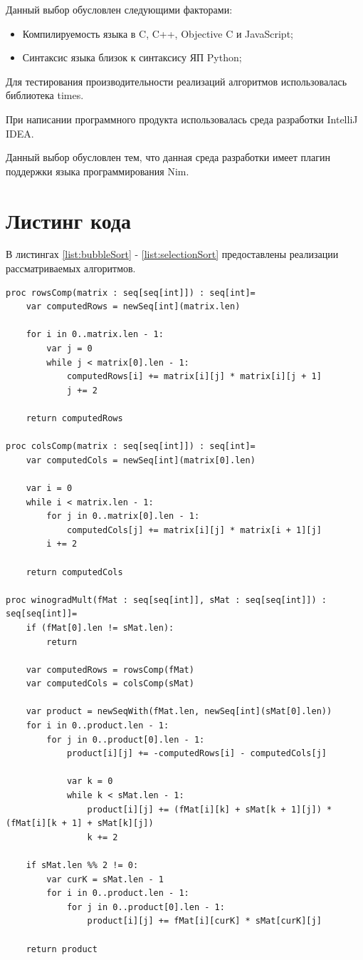 \documentclass[12pt]{report}
\begin{document}
Данный выбор обусловлен следующими факторами:
\begin{itemize}
\item Компилируемость языка в C, C++, Objective C и JavaScript;
\item Синтаксис языка близок к синтаксису ЯП Python;
\end{itemize}

Для тестирования производительности реализаций алгоритмов использовалась библиотека times.

При написании программного продукта использовалась среда разработки IntelliJ IDEA.

Данный выбор обусловлен тем, что данная среда разработки имеет плагин поддержки языка программирования Nim.

\section{Листинг кода}
В листингах \ref{list:bubbleSort} - \ref{list:selectionSort} предоставлены реализации рассматриваемых алгоритмов.
\begin{lstlisting}[caption=Алгоритм Капперсмита-Винограда в последовательной реализации,
label={list:winogradClassic}]
proc rowsComp(matrix : seq[seq[int]]) : seq[int]=
    var computedRows = newSeq[int](matrix.len)

    for i in 0..matrix.len - 1:
        var j = 0
        while j < matrix[0].len - 1:
            computedRows[i] += matrix[i][j] * matrix[i][j + 1]
            j += 2

    return computedRows

proc colsComp(matrix : seq[seq[int]]) : seq[int]=
    var computedCols = newSeq[int](matrix[0].len)

    var i = 0
    while i < matrix.len - 1:
        for j in 0..matrix[0].len - 1:
            computedCols[j] += matrix[i][j] * matrix[i + 1][j]
        i += 2

    return computedCols

proc winogradMult(fMat : seq[seq[int]], sMat : seq[seq[int]]) : seq[seq[int]]=
    if (fMat[0].len != sMat.len):
        return

    var computedRows = rowsComp(fMat)
    var computedCols = colsComp(sMat)

    var product = newSeqWith(fMat.len, newSeq[int](sMat[0].len))
    for i in 0..product.len - 1:
        for j in 0..product[0].len - 1:
            product[i][j] += -computedRows[i] - computedCols[j]

            var k = 0
            while k < sMat.len - 1:
                product[i][j] += (fMat[i][k] + sMat[k + 1][j]) * (fMat[i][k + 1] + sMat[k][j])
                k += 2

    if sMat.len %% 2 != 0:
        var curK = sMat.len - 1
        for i in 0..product.len - 1:
            for j in 0..product[0].len - 1:
                product[i][j] += fMat[i][curK] * sMat[curK][j]

    return product
\end{lstlisting}
\end{document}
